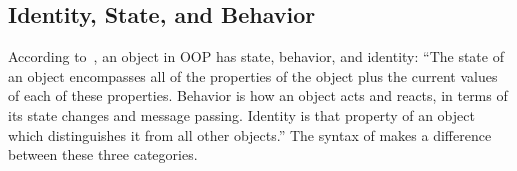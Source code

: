 \begin{figure*}
\begin{multicols}{2}
\begin{tabbing}
 \df {}  \\
 \df {}  \\
  \> \alt \V{(}  \V{)} \\
  \> \alt {} \V{:}  \\
  \> \alt {}  \\
  \> \alt {}   \\
 \df {}  \\
 \df {} \alt {} \alt {} \alt {} \\
  \> \alt {} \alt {} \\
 \df {}  \alt \V{-{}-} \\
 \df {} \alt {} \\
 \df \RE{[\textbackslash{}dA-F][\textbackslash{}dA-F]} \\
 \df {} \\
 \df {} \\
 \df {} \\
 \df {}  \\
 \df {} \\
\end{tabbing}
\end{multicols}
\label{fig:bnf}
\end{figure*}

\subsection{Identity, State, and Behavior}

According to~\citet{grady2007object}, an object in OOP has state, behavior, and identity:
``The state of an object encompasses all of the properties of
the object plus the current values of each of these properties.
Behavior is how an object acts and reacts, in terms of its state changes and message passing.
Identity is that property of an object which distinguishes it from all other objects.''
The syntax of \eo{} makes a difference between these three categories.

